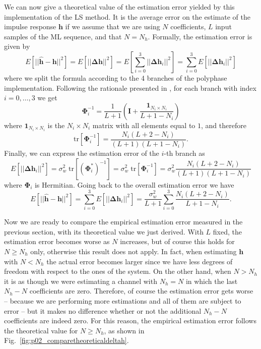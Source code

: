\documentclass[10pt]{article}
\newcommand{\tr} {\mathrm{tr}}
\begin{document}
We can now give a theoretical value of the estimation error yielded by this implementation of the LS method. It is the average error on the estimate of the impulse response $\mathbf{h}$ if we assume that we are using $N$ coefficients, $L$ input samples of the ML sequence, and that $N=N_h$. Formally, the estimation error is given by
\begin{equation}
	E[||\mathbf{\hat{h}}-\mathbf{h}||^2] = E[||\mathbf{\Delta h}||^2] = E\left[\sum_{i=0}^{3} ||\mathbf{\Delta h}_i||^2\right] = \sum_{i=0}^{3} E[||\mathbf{\Delta h}_i||^2]
\end{equation}
where we split the formula according to the 4 branches of the polyphase implementation. Following the rationale presented in \cite{bc}, for each branch with index $i=0,\ldots,3$ we get
\begin{equation}
	\mathbf{\Phi}_i^{-1} = \frac{1}{L+1} \left( \mathbf{I} + \frac{\mathbf{1}_{N_i \times N_i}}{L+1-N_i} \right)
\end{equation}
where $\mathbf{1}_{N_i \times N_i}$ is the $N_i \times N_i$ matrix with all elements equal to $1$, and therefore
\begin{equation}
	\tr [\mathbf{\Phi}_i^{-1}] = \frac{N_i(L+2-N_i)}{(L+1)(L+1-N_i)}.
\end{equation}
Finally, we can express the estimation error of the $i$-th branch as
\begin{equation}
	E[||\mathbf{\Delta h}_i||^2] = \sigma_w^2 \; \tr [(\mathbf{\Phi}_i^*)^{-1}] = \sigma_w^2 \; \tr [\mathbf{\Phi}_i^{-1}] = \sigma_w^2 \frac{N_i(L+2-N_i)}{(L+1)(L+1-N_i)}
\end{equation}
where $\mathbf{\Phi}_i$ is Hermitian. Going back to the overall estimation error we have
\begin{equation}
	E[||\mathbf{\hat{h}}-\mathbf{h}||^2] = \sum_{i=0}^{3} E[||\mathbf{\Delta h}_i||^2] = \frac{\sigma_w^2}{L+1} \sum_{i=0}^{3} \frac{N_i (L+2-N_i)}{L+1-N_i}.
\end{equation}

Now we are ready to compare the empirical estimation error measured in the previous section, with its theoretical value we just derived. With $L$ fixed, the estimation error becomes worse as $N$ increases, but of course this holds for $N \geq N_h$ only, otherwise this result does not apply. In fact, when estimating $\mathbf{h}$ with $N<N_h$ the actual error becomes larger since we have less degrees of freedom with respect to the ones of the system. On the other hand, when $N > N_h$ it is as though we were estimating a channel with $N_h = N$ in which the last $N_h - N$ coefficients are zero. Therefore, of course the estimation error gets worse -- because we are performing more estimations and all of them are subject to error -- but it makes no difference whether or not the additional $N_h - N$ coefficients are indeed zero. For this reason, the empirical estimation error follows the theoretical value for $N \geq N_h$, as shown in Fig.~\ref{fig:p02_comparetheoreticaldeltah}.
\end{document}
